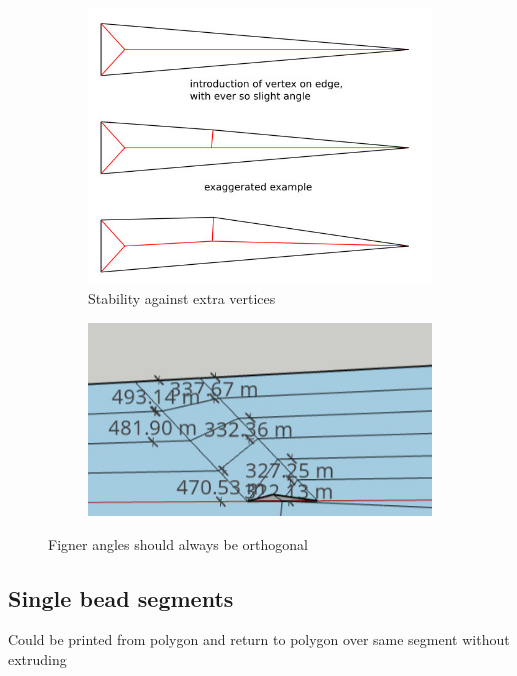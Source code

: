\begin{figure}[H]
\begin{subfigure}{0.45\columnwidth}
\includegraphics[width=\columnwidth]{sources/method/finger_angles.jpg}
\caption{Stability against extra vertices}
\label{finger_angles_stability}
\end{subfigure}
\begin{subfigure}{0.45\columnwidth}
\includegraphics[width=\columnwidth]{sources/method/finger_angles_2.jpg}
\end{subfigure}
\caption{Figner angles should always be orthogonal}
\label{finger_angles}
\end{figure}



\subsection{Single bead segments}
Could be printed from polygon and return to polygon over same segment without extruding

